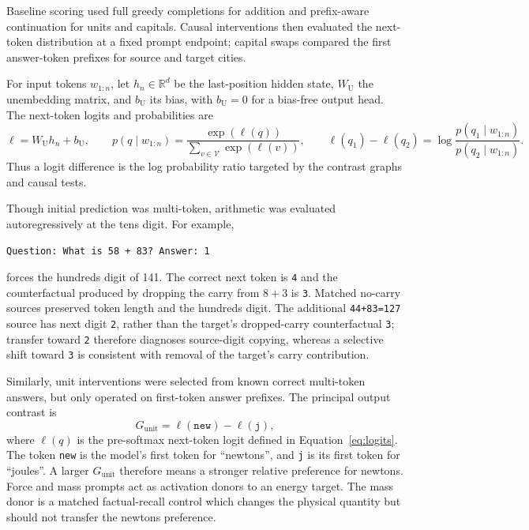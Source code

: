 \documentclass[11pt,a4paper]{article}
\newcommand{\code}[1]{\nolinkurl{#1}}
\newcommand{\prompt}[1]{\texttt{#1}}
\begin{document}
    Baseline scoring used full greedy completions for addition and prefix-aware continuation for units and capitals. Causal interventions then evaluated the next-token distribution at a fixed prompt endpoint; capital swaps compared the first answer-token prefixes for source and target cities.

    For input tokens $w_{1:n}$, let $h_n\in\mathbb{R}^{d}$ be the last-position hidden state, $W_{\mathrm U}$ the unembedding matrix, and $b_{\mathrm U}$ its bias, with $b_{\mathrm U}=0$ for a bias-free output head. The next-token logits and probabilities are
    \begin{equation}
        \boldsymbol{\ell}=W_{\mathrm U}h_n+b_{\mathrm U},\qquad p(q\mid w_{1:n})=\frac{\exp(\ell(q))}{\sum_{v\in\mathcal{V}}\exp(\ell(v))},\qquad \ell(q_1)-\ell(q_2)=\log\frac{p(q_1\mid w_{1:n})}{p(q_2\mid w_{1:n})}.
        \label{eq:logits}
    \end{equation}
    Thus a logit difference is the log probability ratio targeted by the contrast graphs and causal tests.

    Though initial prediction was multi-token, arithmetic was evaluated autoregressively at the tens digit. For example,
    \begin{center}
    \prompt{Question: What is 58 + 83? Answer: 1}
    \end{center} forces the hundreds digit of 141. The correct next token is \texttt{4} and the counterfactual produced by dropping the carry from $8+3$ is \texttt{3}. Matched no-carry sources preserved token length and the hundreds digit. The additional \code{44+83=127} source has next digit \texttt{2}, rather than the target's dropped-carry counterfactual \texttt{3}; transfer toward \texttt{2} therefore diagnoses source-digit copying, whereas a selective shift toward \texttt{3} is consistent with removal of the target's carry contribution.

    Similarly, unit interventions were selected from known correct multi-token answers, but only operated on first-token answer prefixes. The principal output contrast is
    \begin{equation}
            G_{\mathrm{unit}}=\ell(\texttt{new})-\ell(\texttt{j}),
        \label{eq:unit-gap}
    \end{equation}
    where $\ell(q)$ is the pre-softmax next-token logit defined in Equation~\ref{eq:logits}. The token \texttt{new} is the model's first token for ``newtons'', and \texttt{j} is its first token for ``joules''. A larger $G_{\mathrm{unit}}$ therefore means a stronger relative preference for newtons. Force and mass prompts act as activation donors to an energy target. The mass donor is a matched factual-recall control which changes the physical quantity but should not transfer the newtons preference.
\end{document}
